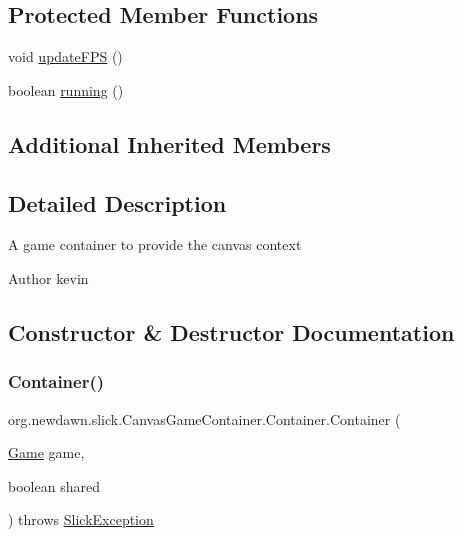 \subsection*{Protected Member Functions}
\begin{DoxyCompactItemize}
\item 
void \mbox{\hyperlink{classorg_1_1newdawn_1_1slick_1_1_canvas_game_container_1_1_container_a2f517d5a251e77f9f6f8d3ee6a7c89c1}{update\+F\+PS}} ()
\item 
boolean \mbox{\hyperlink{classorg_1_1newdawn_1_1slick_1_1_canvas_game_container_1_1_container_a121236f5afee614695471048aa439611}{running}} ()
\end{DoxyCompactItemize}
\subsection*{Additional Inherited Members}


\subsection{Detailed Description}
A game container to provide the canvas context

\begin{DoxyAuthor}{Author}
kevin 
\end{DoxyAuthor}


\subsection{Constructor \& Destructor Documentation}
\mbox{\label{classorg_1_1newdawn_1_1slick_1_1_canvas_game_container_1_1_container_a3d58909b4612f1251c85e01234d07ac0}} 
\subsubsection{\texorpdfstring{Container()}{Container()}}
{\footnotesize\ttfamily org.\+newdawn.\+slick.\+Canvas\+Game\+Container.\+Container.\+Container (\begin{DoxyParamCaption}\item[{\mbox{\hyperlink{interfaceorg_1_1newdawn_1_1slick_1_1_game}{Game}}}]{game,  }\item[{boolean}]{shared }\end{DoxyParamCaption}) throws \mbox{\hyperlink{classorg_1_1newdawn_1_1slick_1_1_slick_exception}{Slick\+Exception}}\hspace{0.3cm}{\ttfamily [inline]}}

